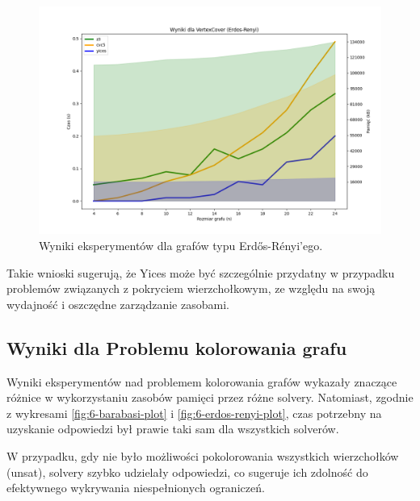\begin{figure}[htbp]
	\centering
	\begin{minipage}{\textwidth}
		\includegraphics[width=\textwidth]{./figures/5-erdos-renyi-plot.png}
		\caption{Wyniki eksperymentów dla grafów typu Erdős-Rényi'ego.}
		\label{fig:5-erdos-renyi-plot}
	\end{minipage}
\end{figure}

Takie wnioski sugerują, że Yices może być szczególnie przydatny w przypadku problemów związanych z pokryciem wierzchołkowym, ze względu na swoją wydajność i oszczędne zarządzanie zasobami. 

\subsection{Wyniki dla Problemu kolorowania grafu}

Wyniki eksperymentów nad problemem kolorowania grafów wykazały znaczące różnice w wykorzystaniu zasobów pamięci przez różne solvery. Natomiast, zgodnie z wykresami \ref{fig:6-barabasi-plot} i \ref{fig:6-erdos-renyi-plot}, czas potrzebny na uzyskanie odpowiedzi był prawie taki sam dla wszystkich solverów. 

W przypadku, gdy nie było możliwości pokolorowania wszystkich wierzchołków (unsat), solvery szybko udzielały odpowiedzi, co sugeruje ich zdolność do efektywnego wykrywania niespełnionych ograniczeń.

